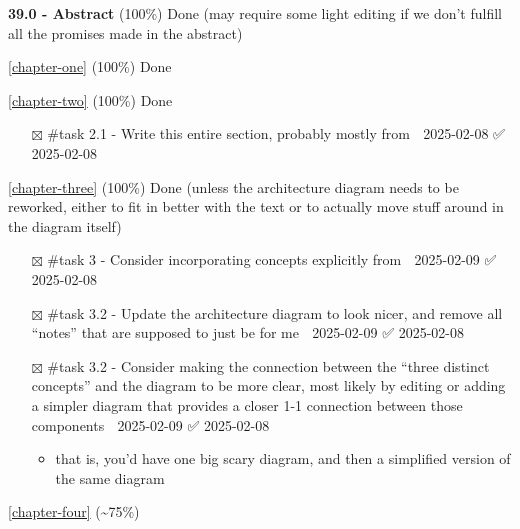 \textbf{39.0 - Abstract} (100\%) Done (may require some light editing if
we don't fulfill all the promises made in the abstract)

\autoref{chapter-one} (100\%) Done

\autoref{chapter-two} (100\%) Done

\begin{itemize}
\tightlist
\item[$\boxtimes$]
  \#task 2.1 - Write this entire section, probably mostly from
  \cite{grajedaAvailabilityDatasetsDigital2017} 📅 2025-02-08 ✅
  2025-02-08
\end{itemize}

\autoref{chapter-three} (100\%) Done (unless the
architecture diagram needs to be reworked, either to fit in better with
the text or to actually move stuff around in the diagram itself)

\begin{itemize}
\tightlist
\item[$\boxtimes$]
  \#task 3 - Consider incorporating concepts explicitly from
  \cite{horsmanDatasetConstructionChallenges2021} 📅 2025-02-09 ✅
  2025-02-08
\item[$\boxtimes$]
  \#task 3.2 - Update the architecture diagram to look nicer, and remove
  all ``notes'' that are supposed to just be for me 📅 2025-02-09 ✅
  2025-02-08
\item[$\boxtimes$]
  \#task 3.2 - Consider making the connection between the ``three
  distinct concepts'' and the diagram to be more clear, most likely by
  editing or adding a simpler diagram that provides a closer 1-1
  connection between those components 📅 2025-02-09 ✅ 2025-02-08

  \begin{itemize}
  \tightlist
  \item
    that is, you'd have one big scary diagram, and then a simplified
    version of the same diagram
  \end{itemize}
\end{itemize}

\autoref{chapter-four} (\textasciitilde75\%)

